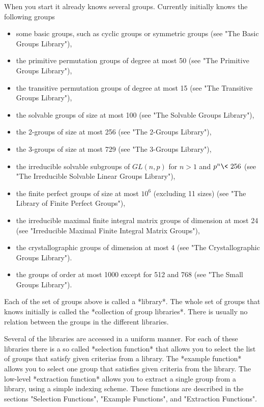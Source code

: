 When you start {\GAP} it  already knows several groups.  Currently {\GAP}
initially knows the  following groups\:
\begin{itemize}
\item some basic groups,  such as cyclic groups or symmetric groups  (see
      "The Basic Groups Library"),
\item the  primitive permutation groups  of degree  at most 50  (see "The
      Primitive Groups Library"),
\item the transitive permutation groups  of degree  at most 15  (see "The
      Transitive Groups Library"),
\item the solvable groups  of size at most 100  (see "The Solvable Groups
      Library"),
\item the  2-groups  of size  at most  256  (see "The 2-Groups Library"),
\item the  3-groups  of size  at most  729  (see "The 3-Groups Library"),
\item the irreducible solvable subgroups of  $GL(n,p)$  for  $n > 1$  and
      $p^n  \<\  256$   (see  "The  Irreducible  Solvable  Linear  Groups
      Library"),
\item the  finite perfect groups  of size  at most  $10^6$  (excluding 11
      sizes) (see "The Library of Finite Perfect Groups"),
\item the irreducible maximal finite integral matrix groups  of dimension
      at  most  24  (see  "Irreducible  Maximal  Finite  Integral  Matrix
      Groups"),
\item the  crystallographic  groups  of  dimension  at most  4  (see "The
      Crystallographic Groups Library").
\item the groups of order at most 1000 except for 512 and 768 (see
      "The Small Groups Library").
\end{itemize}

Each of the set of groups above is called a *library*.   The whole set of
groups that {\GAP}  knows initially is  called the  {\GAP} *collection of
group libraries*.  There is usually no relation between the groups in the
different libraries.

Several of the libraries  are accessed in  a uniform manner.  For each of
these libraries there is a so called *selection function* that allows you
to select the list of groups that satisfy given criterias from a library.
The  *example  function* allows you to  select  one  group that satisfies
given   criteria from the library.   The  low-level *extraction function*
allows you  to extract a  single  group from a   library, using a  simple
indexing scheme. These functions are described in the sections "Selection
Functions", "Example Functions", and "Extraction Functions".

